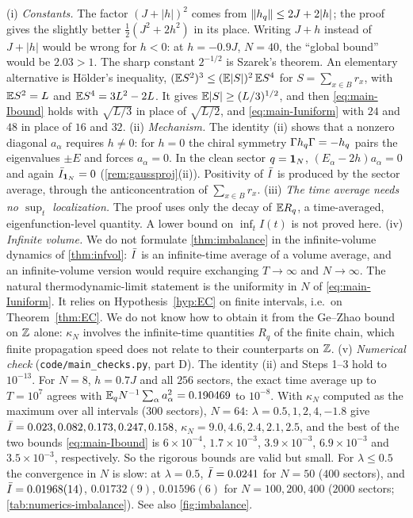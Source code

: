 \begin{remark}\label{rem:main-imbalance}
(i) \emph{Constants.}  The factor $(J+|h|)^2$ comes from $\left\|h_{q}\right\|\le2J+2|h|$; the proof gives the slightly
better $\frac12(J^2+2h^2)$ in its place.  Writing $J+h$ instead of $J+|h|$ would be wrong for $h<0$: at
$h=-0.9J$, $N=40$, the ``global bound'' would be $2.03>1$.  The sharp constant $2^{-1/2}$ is Szarek's theorem.
An elementary alternative is H\"older's inequality,
$(\mathbb{E} S^2)^3\le(\mathbb{E}|S|)^2\,\mathbb{E} S^4$ for $S=\sum_{x\in B}r_x$, with $\mathbb{E} S^2=L$ and $\mathbb{E} S^4=3L^2-2L$.  It gives
$\mathbb{E}|S|\ge(L/3)^{1/2}$, and then \eqref{eq:main-Ibound} holds with $\sqrt{L/3}$ in place of $\sqrt{L/2}$, and
\eqref{eq:main-Iuniform} with $24$ and $48$ in place of $16$ and $32$.
(ii) \emph{Mechanism.}  The identity (ii) shows that a nonzero diagonal $a_\alpha$ requires $h\neq0$: for $h=0$ the
chiral symmetry $\Gamma h_{q}\Gamma=-h_{q}$ pairs the eigenvalues $\pm E$ and forces $a_\alpha=0$.  In the clean sector
$q=\mathbf{1}_N$, $(E_\alpha-2h)a_\alpha=0$ and again $\bar I_{\mathbf{1}_N}=0$ (\cref{rem:gaussproj}(ii)).  Positivity of $\bar I$ is
produced by the sector average, through the anticoncentration of $\sum_{x\in B}r_x$.
(iii) \emph{The time average needs no $\sup_t$ localization.}  The proof uses only the decay of $\mathbb{E} R_q$, a
time-averaged, eigenfunction-level quantity.  A lower bound on $\inf_tI(t)$ is not proved here.
(iv) \emph{Infinite volume.}  We do not formulate \cref{thm:imbalance} in the infinite-volume dynamics of
\cref{thm:infvol}: $\bar I$ is an infinite-time average of a volume average, and an infinite-volume version
would require exchanging $T\to\infty$ and $N\to\infty$.  The natural thermodynamic-limit statement is the
uniformity in $N$ of \eqref{eq:main-Iuniform}.  It relies on Hypothesis~\ref{hyp:EC} on finite intervals,
i.e.\ on Theorem~\ref{thm:EC}.  We do not know how to obtain it from the Ge--Zhao bound on $\mathbb{Z}$ alone:
$\kappa_N$ involves the infinite-time quantities $R_q$ of the finite chain, which finite propagation speed
does not relate to their counterparts on $\mathbb{Z}$.
(v) \emph{Numerical check} (\texttt{code/main\_checks.py}, part D).  The identity (ii) and Steps 1--3 hold to
$10^{-13}$.  For $N=8$, $h=0.7J$ and all $256$ sectors, the exact time average up to $T=10^7$ agrees with
$\mathbb{E}_qN^{-1}\sum_\alpha a_\alpha^2=0.190469$ to $10^{-8}$.  With $\kappa_N$ computed as the maximum over all
intervals ($300$ sectors), $N=64$: $\lambda=0.5,1,2,4,-1.8$ give $\bar I=0.023,0.082,0.173,0.247,0.158$,
$\kappa_N=9.0,4.6,2.4,2.1,2.5$, and the best of the two bounds \eqref{eq:main-Ibound} is $6\times10^{-4}$,
$1.7\times10^{-3}$, $3.9\times10^{-3}$, $6.9\times10^{-3}$ and $3.5\times10^{-3}$, respectively.  So the
rigorous bounds are valid but small.  For $\lambda\le0.5$ the convergence in $N$ is slow: at $\lambda=0.5$,
$\bar I=0.0241$ for $N=50$ ($400$ sectors), and $\bar I=0.01968(14)$, $0.01732(9)$, $0.01596(6)$ for $N=100,200,400$
($2000$ sectors; \cref{tab:numerics-imbalance}).  See also \cref{fig:imbalance}.
\end{remark}

